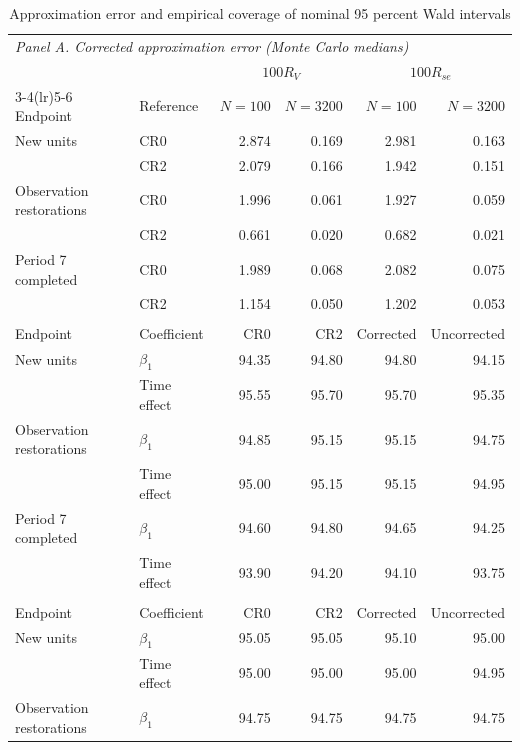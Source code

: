 \begin{table}[H]
\centering
\caption{Approximation error and empirical coverage of nominal 95 percent Wald intervals}
\label{tab:approximation-endpoints}
\small{}
\setlength{\tabcolsep}{5pt}
\begin{tabular}{@{}llrrrr@{}}
\toprule
\multicolumn{6}{l}{\textit{Panel A. Corrected approximation error (Monte Carlo medians)}}\\
\addlinespace
& & \multicolumn{2}{c}{$100R_V$} & \multicolumn{2}{c}{$100R_{se}$}\\
\cmidrule(lr){3-4}\cmidrule(lr){5-6}
Endpoint & Reference & $N=100$ & $N=3200$ & $N=100$ & $N=3200$\\
\midrule
New units & CR0 & 2.874 & 0.169 & 2.981 & 0.163 \\
 & CR2 & 2.079 & 0.166 & 1.942 & 0.151 \\
Observation restorations & CR0 & 1.996 & 0.061 & 1.927 & 0.059 \\
 & CR2 & 0.661 & 0.020 & 0.682 & 0.021 \\
Period 7 completed & CR0 & 1.989 & 0.068 & 2.082 & 0.075 \\
 & CR2 & 1.154 & 0.050 & 1.202 & 0.053 \\
\addlinespace[5pt]
\multicolumn{6}{l}{\textit{Panel B. Empirical coverage at $N=100$ (\%)}}\\
\addlinespace
Endpoint & Coefficient & CR0 & CR2 & Corrected & Uncorrected\\
\midrule
New units & $\beta_1$ & 94.35 & 94.80 & 94.80 & 94.15 \\
 & Time effect & 95.55 & 95.70 & 95.70 & 95.35 \\
Observation restorations & $\beta_1$ & 94.85 & 95.15 & 95.15 & 94.75 \\
 & Time effect & 95.00 & 95.15 & 95.15 & 94.95 \\
Period 7 completed & $\beta_1$ & 94.60 & 94.80 & 94.65 & 94.25 \\
 & Time effect & 93.90 & 94.20 & 94.10 & 93.75 \\
\addlinespace[5pt]
\multicolumn{6}{l}{\textit{Panel C. Empirical coverage at $N=3200$ (\%)}}\\
\addlinespace
Endpoint & Coefficient & CR0 & CR2 & Corrected & Uncorrected\\
\midrule
New units & $\beta_1$ & 95.05 & 95.05 & 95.10 & 95.00 \\
 & Time effect & 95.00 & 95.00 & 95.00 & 94.95 \\
Observation restorations & $\beta_1$ & 94.75 & 94.75 & 94.75 & 94.75 \\

\end{tabular}
\end{table}
